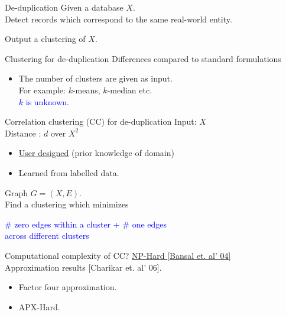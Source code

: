 \documentclass{beamer}
\begin{document}
\begin{frame}{De-duplication}
	\onslide<1->
    Given a database $X$. \\

    \vspace{10pt}\alert{Detect} records which correspond to the same real-world entity.
    
    \vspace{30pt}Output a clustering of $X$.
\end{frame}

\begin{frame}{Clustering for de-duplication}
	Differences compared to standard formulations\\
    \begin{itemize}
    	\vspace{10pt}\item The number of clusters are given as input. \\
    	For example: $k$-means, $k$-median etc.\\
    	\vspace{10pt}\textcolor{blue}{$k$ is unknown.}
	\end{itemize}    	
\end{frame}

\begin{frame}[label=CC]{Correlation clustering (CC) for de-duplication}
	Input: $X$\\
	Distance   : $d$ over $X^2$\\
	\begin{itemize}
		\item \hyperlink{notesCC}{User designed} (prior knowledge of domain) 
		\item Learned from labelled data.
	\end{itemize}
	 
	\vspace{20pt}Graph $G = (X, E)$. \\
    \vspace{10pt}Find a clustering which minimizes
    
    \begin{center}
    \textcolor{blue}{\# zero edges within a cluster + \# one edges\\ across different clusters}
    \end{center}
    
\end{frame}

\begin{frame}[label=CCHardness]{Computational complexity of CC?}
	\hyperlink{notesCCHardness}{NP-Hard \alert{[Bansal et. al' 04]}}\\
	
	\vspace{30pt}Approximation results \alert{[Charikar et. al' 06]}.
	\begin{itemize}
		\vspace{10pt}\item Factor four approximation. 
		\vspace{10pt}\item APX-Hard. 
 	\end{itemize}
\end{frame}
\end{document}
